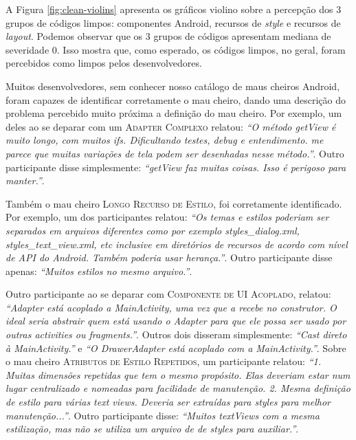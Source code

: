 A Figura \ref{fig:clean-violins} apresenta os gráficos violino sobre a percepção dos 3 grupos de códigos limpos: componentes Android, recursos de \textit{style} e recursos de \textit{layout}. Podemos observar que os 3 grupos de códigos apresentam mediana de severidade 0. Isso mostra que, como esperado, os códigos limpos, no geral, foram percebidos como limpos pelos desenvolvedores.

Muitos desenvolvedores, sem conhecer nosso catálogo de maus cheiros Android, foram capazes de identificar corretamente o mau cheiro, dando uma descrição do problema percebido muito próxima a definição do mau cheiro. Por exemplo, um deles ao se deparar com um \textsc{\small Adapter Complexo} relatou: \textit{``O método getView é muito longo, com muitos ifs. Dificultando testes, debug e entendimento. me parece que muitas variações de tela podem ser desenhadas nesse método.''}. Outro participante disse simplesmente: \textit{``getView faz muitas coisas. Isso é perigoso para manter.''}. 

Também o mau cheiro \textsc{\small Longo Recurso de Estilo}, foi corretamente identificado. Por exemplo, um dos participantes relatou: \textit{``Os temas e estilos poderiam ser separados em arquivos diferentes como por exemplo styles\_dialog.xml, styles\_text\_view.xml, etc inclusive em diretórios de recursos de acordo com nível de API do Android. Também poderia usar herança.''}. Outro participante disse apenas: \textit{``Muitos estilos no mesmo arquivo.''}. 

Outro participante ao se deparar com \textsc{\small Componente de UI Acoplado}, relatou: \textit{``Adapter está acoplado a MainActivity, uma vez que a recebe no construtor. O ideal seria abstrair quem está usando o Adapter para que ele possa ser usado por outras activities ou fragments.''}. Outros dois disseram simplesmente: \textit{``Cast direto à MainActivity.''} e \textit{``O DrawerAdapter está acoplado com a MainActivity.''}. Sobre o mau cheiro \textsc{\small Atributos de Estilo Repetidos}, um participante relatou: \textit{``1. Muitas dimensões repetidas que tem o mesmo propósito. Elas deveriam estar num lugar centralizado e nomeadas para facilidade de manutenção. 2. Mesma definição de estilo para várias text views. Deveria ser extraídas para styles para melhor manutenção...''}. Outro participante disse: \textit{``Muitos textViews com a mesma estilização, mas não se utiliza um arquivo de de styles para auxiliar.''}.

